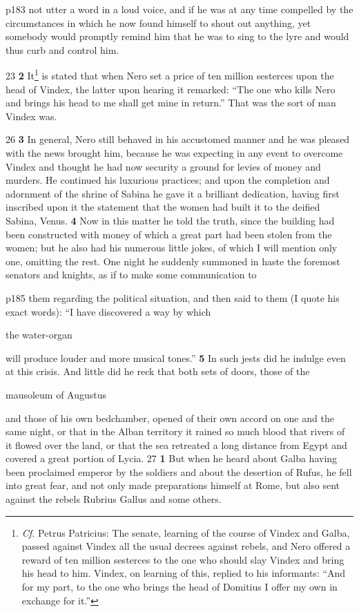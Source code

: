 p183 not utter a word in a loud voice, and if he was at any time compelled by the circumstances in which he now found himself to shout out anything, yet somebody would promptly remind him that he was to sing to the lyre and would thus curb and control him.

23
\textbf{2} It\texthebrew{⁠}\footnote{\emph{Cf.} Petrus Patricius: The senate, learning of the course of Vindex and Galba, passed against Vindex all the usual decrees against rebels, and Nero offered a reward of ten million sesterces to the one who should slay Vindex and bring his head to him. Vindex, on learning of this, replied to his informants: ``And for my part, to the one who brings the head of Domitius I offer my own in exchange for it.''

} is stated that when Nero set a price of ten million sesterces upon the head of Vindex, the latter upon hearing it remarked: ``The one who kills Nero and brings his head to me shall get mine in return.'' That was the sort of man Vindex was.

26
\textbf{3} In general, Nero still behaved in his accustomed manner and he was pleased with the news brought him, because he was expecting in any event to overcome Vindex and thought he had now security a ground for levies of money and murders. He continued his luxurious practices; and upon the completion and adornment of the shrine of Sabina he gave it a brilliant dedication, having first inscribed upon it the statement that the women had built it to the deified Sabina, Venus. \textbf{4} Now in this matter he told the truth, since the building had been constructed with money of which a great part had been stolen from the women; but he also had his numerous little jokes, of which I will mention only one, omitting the rest. One night he suddenly summoned in haste the foremost senators and knights, as if to make some communication to

p185 them regarding the political situation, and then said to them (I quote his exact words): ``I have discovered a way by which

the water-organ

will produce louder and more musical tones.'' \textbf{5} In such jests did he indulge even at this crisis. And little did he reck that both sets of doors, those of the

mausoleum of Augustus

and those of his own bedchamber, opened of their own accord on one and the same night, or that in the Alban territory it rained so much blood that rivers of it flowed over the land, or that the sea retreated a long distance from Egypt and covered a great portion of Lycia.
27
\textbf{1} But when he heard about Galba having been proclaimed emperor by the soldiers and about the desertion of Rufus, he fell into great fear, and not only made preparations himself at Rome, but also sent against the rebels Rubrius Gallus and some others.

